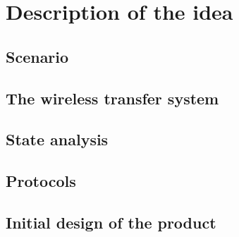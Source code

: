 \documentclass[a4paper, 10pt]{article}
\begin{document}


\section{Description of the idea}
\label{sec:idea}


\subsection{Scenario}
\label{sec:scenario}


\subsection{The wireless transfer system}
\label{sec:realize}


\subsection{State analysis}
\label{sec:states}


\subsection{Protocols}
\label{sec:proto}


\subsection{Initial design of the product}
\label{indesign}

\end{document}
